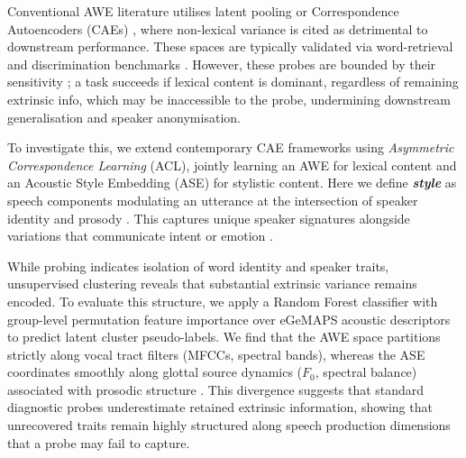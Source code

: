 \documentclass[conference,letterpaper]{IEEEtran}
\begin{document}
Conventional AWE literature utilises latent pooling \cite{sanabria2023analyzing} or Correspondence Autoencoders (CAEs) \cite{DBLP:journals/corr/abs-1811-00403}, where non-lexical variance is cited as detrimental to downstream performance. These spaces are typically validated via word-retrieval and discrimination benchmarks \cite{abdullah2022integratingformmeaningmultitask, settle2016discriminativeacousticwordembeddings, kamper2016deepconvolutionalacousticword, algayres2020evaluatingreliabilityacousticspeech}. However, these probes are bounded by their sensitivity \cite{hewitt2019designinginterpretingprobescontrol}; a task succeeds if lexical content is dominant, regardless of remaining extrinsic info, which may be inaccessible to the probe, undermining downstream generalisation and speaker anonymisation.

To investigate this, we extend contemporary CAE frameworks \cite{meghanani-hain-2024-improving} using \textit{Asymmetric Correspondence Learning} (ACL), jointly learning an AWE for lexical content and an Acoustic Style Embedding (ASE) for stylistic content. Here we define \textbf{\textit{style}} as speech components modulating an utterance at the intersection of speaker identity and prosody \cite{zhu2024unistyle, SCHULLER20134}. This captures unique speaker signatures alongside variations that communicate intent or emotion \cite{DBLP:journals/corr/abs-1803-09017}.

While probing indicates isolation of word identity and speaker traits, unsupervised clustering reveals that substantial extrinsic variance remains encoded. To evaluate this structure, we apply a Random Forest classifier with group-level permutation feature importance \cite{breiman2001random} over eGeMAPS acoustic descriptors \cite{eyben2015geneva} to predict latent cluster pseudo-labels. We find that the AWE space partitions strictly along vocal tract filters (MFCCs, spectral bands), whereas the ASE coordinates smoothly along glottal source dynamics ($F_0$, spectral balance) associated with prosodic structure \cite{Triantafyllopoulos_2023}. This divergence suggests that standard diagnostic probes underestimate retained extrinsic information, showing that unrecovered traits remain highly structured along speech production dimensions that a probe may fail to capture.
\end{document}

